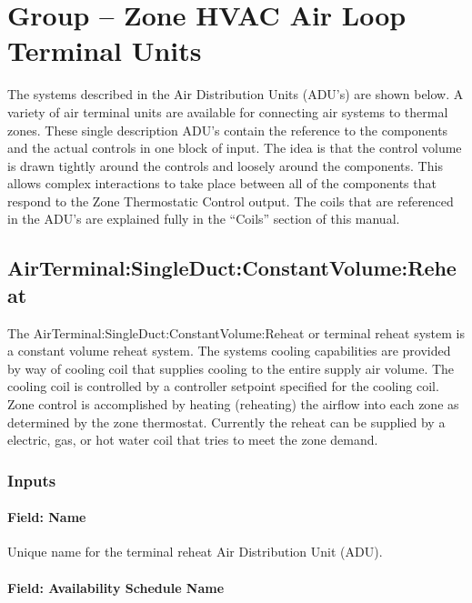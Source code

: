 \section{Group -- Zone HVAC Air Loop Terminal Units}\label{group-air-distribution-equipment}

The systems described in the Air Distribution Units (ADU's) are shown below. A variety of air terminal units are available for connecting air systems to thermal zones. These single description ADU's contain the reference to the components and the actual controls in one block of input. The idea is that the control volume is drawn tightly around the controls and loosely around the components. This allows complex interactions to take place between all of the components that respond to the Zone Thermostatic Control output. The coils that are referenced in the ADU's are explained fully in the ``Coils'' section of this manual.

\subsection{AirTerminal:SingleDuct:ConstantVolume:Reheat}\label{airterminalsingleductconstantvolumereheat}

The AirTerminal:SingleDuct:ConstantVolume:Reheat or terminal reheat system is a constant volume reheat system. The systems cooling capabilities are provided by way of cooling coil that supplies cooling to the entire supply air volume. The cooling coil is controlled by a controller setpoint specified for the cooling coil. Zone control is accomplished by heating (reheating) the airflow into each zone as determined by the zone thermostat. Currently the reheat can be supplied by a electric, gas, or hot water coil that tries to meet the zone demand.

\subsubsection{Inputs}

\paragraph{Field: Name}

Unique name for the terminal reheat Air Distribution Unit (ADU).

\paragraph{Field: Availability Schedule Name}


